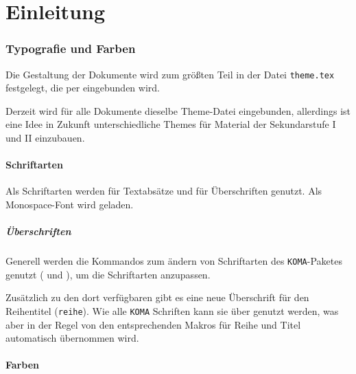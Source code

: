 \part{Einleitung}\label{part:einleitung}

\section{Typografie und Farben}\label{sec:typografie}
Die Gestaltung der Dokumente wird zum größten Teil in der Datei \texttt{theme.tex} festgelegt, die per  eingebunden wird.

Derzeit wird für alle Dokumente dieselbe Theme-Datei eingebunden, allerdings ist eine Idee in Zukunft unterschiedliche Themes für Material der Sekundarstufe I und II einzubauen.

\subsection{Schriftarten}\label{sec:schriften}
Als Schriftarten werden  für Textabsätze und  für Überschriften genutzt. Als Monospace-Font wird  geladen.

\subsubsection{Überschriften}\label{sec:ueberschriften}
Generell werden die Kommandos zum ändern von Schriftarten des \texttt{KOMA}-Paketes genutzt ( und ), um die Schriftarten anzupassen.

Zusätzlich zu den dort verfügbaren gibt es eine neue Überschrift für den Reihentitel (\texttt{reihe}). Wie alle \texttt{KOMA} Schriften kann sie über  genutzt werden, was  aber in der Regel von den entsprechenden Makros für Reihe und Titel automatisch übernommen wird.

\subsection{Farben}\label{sec:farben}